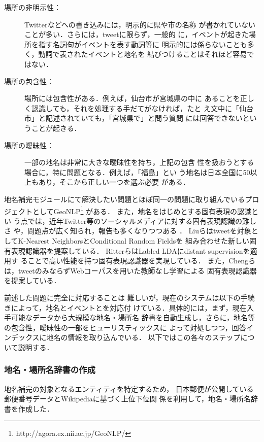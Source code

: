 \documentclass[japanese]{jnlp_1.4}
\begin{document}
\begin{description}
 \item[場所の非明示性：]Twitterなどへの書き込みには，明示的に県や市の名称
	    が書かれていないことが多い．さらには，tweetに限らず，一般的
	    に，イベントが起きた場所を指す名詞句がイベントを表す動詞等に
	    明示的には係らないことも多く，動詞で表されたイベントと地名を
	    結びつけることはそれほど容易ではない．
 \item[場所の包含性：] 場所には包含性がある．例えば，仙台市が宮城県の中に
	    あることを正しく認識しても，それを処理する手だてがなければ，たと
	    え文中に「仙台市」と記述されていても，「宮城県で」と問う質問
	    には回答できないということが起きる．
 \item[場所の曖昧性：]  一部の地名は非常に大きな曖昧性を持ち，上記の包含
	    性を扱おうとする場合に，特に問題となる．例えば，「福島」とい
	    う地名は日本全国に50以上もあり，そこから正しい一つを選ぶ必要
	    がある．
\end{description}

地名補完モジュールにて解決したい問題とほぼ同一の問題に取り組んでいるプロ
ジェクトとしてGeoNLP\footnote{http://agora.ex.nii.ac.jp/GeoNLP/} がある．
また，地名をはじめとする固有表現の認識とい
う点では，近年Twitter等のソーシャルメディアに対する固有表現認識の難しさ
や，問題点が広く知られ，報告も多くなりつつある
\cite{Liu2013,Ritter2011,Cheng2010}．
Liuらはtweetを対象としてK-Nearest NeighborsとConditional Random Fieldsを
組み合わせた新しい固有表現認識器を提案している．
RitterらはLabled LDAにdistant supervisionを適用す
ることで高い性能を持つ固有表現認識器を実現している．
また，Chengらは，tweetのみならずWebコーパスを用いた教師なし学習による
固有表現認識器を提案している．

前述した問題に完全に対応することは
難しいが，現在のシステムは以下の手続きによって，地名とイベントとを対応付
けている．具体的には，まず，現在入手可能なデータから大規模な地名・場所名
辞書を自動生成し，さらに，地名等の包含性，曖昧性の一部をヒューリスティックスに
よって対処しつつ，回答インデックスに地名の情報を取り込んでいる．
以下ではこの各々のステップについて説明する．


\subsubsection{地名・場所名辞書の作成}

地名補完の対象となるエンティティを特定するため，
日本郵便が公開している郵便番号データとWikipediaに基づく上位下位関
係\cite{Yamada2009}を利用して，地名・場所名辞書を作成した．
\end{document}
